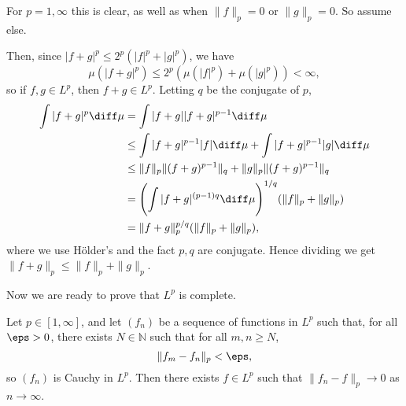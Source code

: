 \documentclass[12pt]{article}
\begin{document}
\begin{proofbox}
	For $p = 1, \infty$ this is clear, as well as when $\|f\|_p = 0$ or $\|g\|_p = 0$. So assume else.

	Then, since $|f+g|^p \leq 2^p(|f|^p + |g|^p)$, we have
	\[
	\mu(|f+g|^p) \leq 2^p(\mu(|f|^p) + \mu(|g|^p)) < \infty,
	\]
	so if $f, g \in L^p$, then $f + g \in L^p$. Letting $q$ be the conjugate of $p$,
	\begin{align*}
		\int |f+g|^p \diff \mu &= \int |f+g||f+g|^{p-1} \diff \mu \\
				       &\leq \int |f+g|^{p-1}|f| \diff \mu + \int |f+g|^{p-1} |g| \diff \mu \\
				       &\leq \|f\|_p \|(f+g)^{p-1}\|_q + \|g\|_p \|(f+g)^{p-1}\|_q \\
				       &= \Biggl( \int |f+g|^{(p-1)q} \diff \mu \Biggr)^{1/q} (\|f\|_p + \|g\|_p) \\
				       &= \|f+g\|_p^{p/q} (\|f\|_p + \|g\|_p),
	\end{align*}
	where we use H\"older's and the fact $p, q$ are conjugate. Hence dividing we get $\|f+g\|_p \leq \|f\|_p + \|g\|_p$.
\end{proofbox}

Now we are ready to prove that $L^p$ is complete.

\begin{theorem}
	Let $p \in [1, \infty]$, and let $(f_n)$ be a sequence of functions in $L^p$ such that, for all $\eps > 0$, there exists $N \in \mathbb{N}$ such that for all $m, n \geq N$,
	\[
	\|f_m - f_n\|_p < \eps,
	\]
	so $(f_n)$ is Cauchy in $L^p$. Then there exists $f \in L^p$ such that $\|f_n - f\|_p \to 0$ as $n \to \infty$.
\end{theorem}
\end{document}

